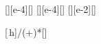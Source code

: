 [\cm\squared][e-4][\m\squared]
[\cm\squared][e-4][\m\squared]
[\cm][e-2][\m]

[\,h]{\AkX/(\AkX+\AgX)*\hUX}[\m]
